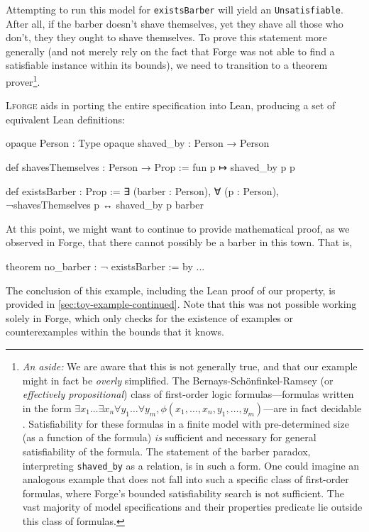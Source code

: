 Attempting to run this model for \texttt{existsBarber} will yield an \texttt{Unsatisfiable}. After all, if the barber doesn't shave themselves, yet they shave all those who don't, they they ought to shave themselves. To prove this statement more generally (and not merely rely on the fact that Forge was not able to find a satisfiable instance within its bounds), we need to transition to a theorem prover\footnote{\emph{An aside:} We are aware that this is not generally true, and that our example might in fact be \emph{overly} simplified. The Bernays-Sch\"onfinkel-Ramsey (or \emph{effectively propositional}) class of first-order logic formulas---formulas written in the form $\exists x_1 \dots \exists x_n \forall y_1 \dots \forall y_m, \phi(x_1, \dots, x_n, y_1, \dots, y_m)$---are in fact decidable \cite{bernays1928entscheidungsproblem,ramsey1987problem}. Satisfiability for these formulas in a finite model with pre-determined size (as a function of the formula) \emph{is} sufficient and necessary for general satisfiability of the formula. The statement of the barber paradox, interpreting \texttt{shaved_by} as a relation, is in such a form. One could imagine an analogous example that does not fall into such a specific class of first-order formulas, where Forge's bounded satisfiability search is not sufficient. The vast majority of model specifications and their properties predicate lie outside this class of formulas.}. 

\textsc{Lforge} aids in porting the entire specification into Lean, producing a set of equivalent Lean definitions: 

\begin{lean*}
opaque Person : Type
opaque shaved_by : Person → Person

def shavesThemselves : Person → Prop :=
  fun p ↦ shaved_by p p

def existsBarber : Prop :=
  ∃ (barber : Person), ∀ (p : Person), ¬shavesThemselves p ↔ shaved_by p barber
\end{lean*}
At this point, we might want to continue to provide mathematical proof, as we observed in Forge, that there cannot possibly be a barber in this town. That is, 

\begin{lean*}
theorem no_barber : ¬ existsBarber := by ...
\end{lean*}
The conclusion of this example, including the Lean proof of our property, is provided in \cref{sec:toy-example-continued}. Note that this was not possible working solely in Forge, which only checks for the existence of examples or counterexamples within the bounds that it knows. 

